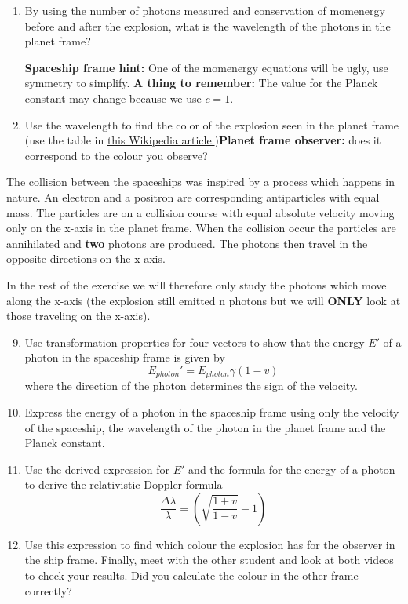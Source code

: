 {\begin{multicols}{2}
\begin{enumerate}
\item By using the number of photons measured and conservation of momenergy before and after the explosion, what is the wavelength of the photons in the planet frame?

\textbf{Spaceship frame hint:} One of the momenergy equations will be ugly, use symmetry to simplify.\newline
\textbf{A thing to remember:} The value for the Planck constant may change because we use $c=1$.

\item Use the wavelength to find the color of the explosion seen in the planet frame (use the table in \href{https://en.wikipedia.org/wiki/Visible_spectrum}{this Wikipedia article.}){\bf Planet frame observer:} does it correspond to the colour you observe?
\end{enumerate}

The collision between the spaceships was inspired by a process which happens in nature. An electron and a positron are corresponding antiparticles with equal mass. The particles are on a collision course with equal absolute velocity moving only on the x-axis in the planet frame. When the collision occur the particles are annihilated and \textbf{two} photons are produced. The photons then travel in the opposite directions on the x-axis.

In the rest of the exercise we will therefore only study the photons which move along the x-axis (the explosion still emitted n photons but we will \textbf{ONLY} look at those traveling on the x-axis). 
\begin{enumerate}
\setcounter{enumi}{8}
\item Use transformation properties for four-vectors to show that the energy $E'$ of a photon in the spaceship frame is given by
\[
E_{photon}'=E_{photon}\gamma(1-v)
\]
where the direction of the photon determines the sign of the velocity.
\item Express the energy of a photon in the spaceship frame using only the velocity of the spaceship, the wavelength of the photon in the planet frame and the Planck constant.
\item Use the derived expression for $E'$ and the formula for the energy of a photon to derive the relativistic Doppler formula
\[
\frac{\Delta\lambda}{\lambda}=\left(\sqrt{\frac{1+v}{1-v}}-1\right)
\]
\item Use this expression to find which colour the explosion has for the observer in the ship frame. Finally, meet with the other student and look at both videos to check your results. Did you calculate the colour in the other frame correctly?


\end{enumerate}
\end{multicols}}
